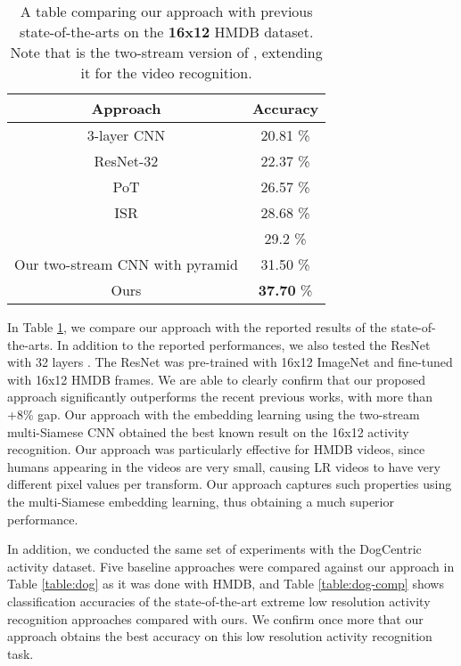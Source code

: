 \documentclass[letterpaper]{article} %
\begin{document}
\begin{table}
	\caption{A table comparing our approach with previous state-of-the-arts on the \textbf{16x12} HMDB dataset. Note that \cite{chen17} is the two-stream version of \cite{lrface16}, extending it for the video recognition.}
	\label{table:hmdb-comp}

	\center
	\setlength\extrarowheight{0.5pt}

		\begin{tabular}{c|c}
			\hline 	Approach & Accuracy \tabularnewline
			\hline 	
			        3-layer CNN \cite{ryoo17privacy} & 20.81 \%	 \tabularnewline
			        ResNet-32 \cite{resnet2016} & 22.37 \%	 \tabularnewline
			        PoT \cite{ryoo15} & 26.57 \% \tabularnewline
			        ISR \cite{ryoo17privacy} & 28.68 \%	 \tabularnewline
			        \cite{chen17} & 29.2 \% \tabularnewline
			\hline
			        Our two-stream CNN with pyramid  & 31.50	\%  \tabularnewline
			        Ours    & \textbf{37.70} \%	  \tabularnewline
			\hline
		\end{tabular}

\end{table}

In Table \ref{table:hmdb-comp}, we compare our approach with the reported results of the state-of-the-arts. In addition to the reported performances, we also tested the ResNet with 32 layers \cite{resnet2016}. The ResNet was pre-trained with 16x12 ImageNet and fine-tuned with 16x12 HMDB frames. We are able to clearly confirm that our proposed approach significantly outperforms the recent previous works, with more than +8\% gap. Our approach with the embedding learning using the two-stream multi-Siamese CNN obtained the best known result on the 16x12 activity recognition. Our approach was particularly effective for HMDB videos, since humans appearing in the videos are very small, causing LR videos to have very different pixel values per transform. Our approach captures such properties using the multi-Siamese embedding learning, thus obtaining a much superior performance.

In addition, we conducted the same set of experiments with the DogCentric activity dataset. Five baseline approaches were compared against our approach in Table \ref{table:dog} as it was done with HMDB, and Table \ref{table:dog-comp} shows classification accuracies of the state-of-the-art extreme low resolution activity recognition approaches compared with ours. We confirm once more that our approach obtains the best accuracy on this low resolution activity recognition task. 
\end{document}
